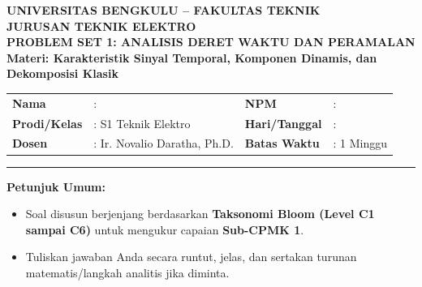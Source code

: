 \documentclass[11pt,a4paper]{article}
\begin{document}
\begin{center}
    {\large \textbf{\color{primaryblue}UNIVERSITAS BENGKULU -- FAKULTAS TEKNIK}}\\[0.1cm]
    {\large \textbf{\color{secondaryblue}JURUSAN TEKNIK ELEKTRO}}\\[0.2cm]
    {\LARGE \textbf{\color{primaryblue}PROBLEM SET 1: ANALISIS DERET WAKTU DAN PERAMALAN}}\\[0.1cm]
    {\normalsize \textbf{Materi: Karakteristik Sinyal Temporal, Komponen Dinamis, dan Dekomposisi Klasik}}
\end{center}

\vspace{0.1cm}

\begin{tcolorbox}[colback=boxbg,colframe=primaryblue,arc=2mm,title=\textbf{Informasi Tugas \& Identitas Mahasiswa}]
\small
\begin{tabular}{p{2.2cm}p{5.5cm}p{2.2cm}p{5.0cm}}
\textbf{Nama} & : \dotfill & \textbf{NPM} & : \dotfill \\
\textbf{Prodi/Kelas} & : S1 Teknik Elektro & \textbf{Hari/Tanggal} & : \dotfill \\
\textbf{Dosen} & : Ir. Novalio Daratha, Ph.D. & \textbf{Batas Waktu} & : 1 Minggu \\
\end{tabular}
\vspace{0.15cm}
\hrule
\vspace{0.15cm}
\textbf{Petunjuk Umum:}
\begin{itemize}[leftmargin=1.2em]
    \item Soal disusun berjenjang berdasarkan \textbf{Taksonomi Bloom (Level C1 sampai C6)} untuk mengukur capaian \textbf{Sub-CPMK 1}.
    \item Tuliskan jawaban Anda secara runtut, jelas, dan sertakan turunan matematis/langkah analitis jika diminta.
\end{itemize}
\end{tcolorbox}

\vspace{0.2cm}

\end{document}
